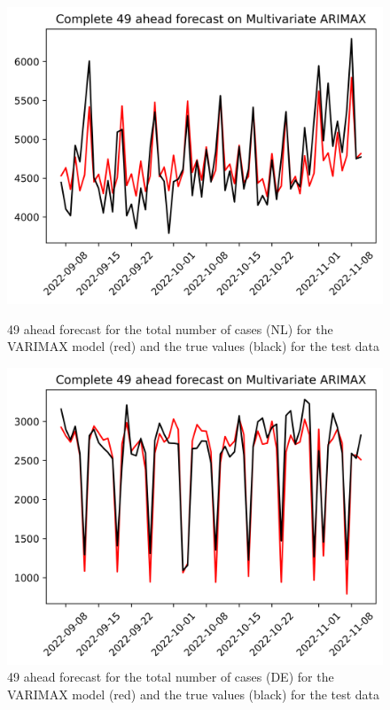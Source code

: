 \begin{figure}

\begin{minipage}{.45\textwidth}
  \centering
  \includegraphics[width=\linewidth]{pics/49_ah/Complete_49_ahead_Multivariate ARIMAX.png}
  \caption{49 ahead forecast for the total number of cases (NL) for the VARIMAX model (red) and the true values (black) for the test data}
  \label{fig:tot_cases_fc_49_VARIMAX}
\end{minipage}
\begin{minipage}{.45\textwidth}
  \centering
  \includegraphics[width=\linewidth]{pics/49_ah/DE_Complete_49_ahead_Multivariate ARIMAX.png}
  \caption{49 ahead forecast for the total number of cases (DE) for the VARIMAX model (red) and the true values (black) for the test data}
  \label{fig:tot_cases_fc_49_VARIMAX_DE}
\end{minipage}

\end{figure}
